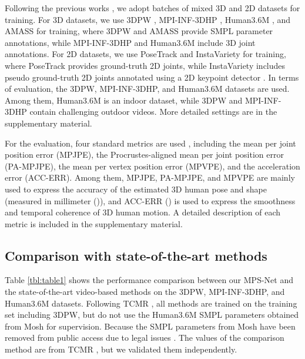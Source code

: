 \documentclass[10pt,twocolumn,letterpaper]{article}
\begin{document}
\vspace{5pt} Following the previous works \cite{Kocabas2020VIBEVI,choi2020beyond}, we adopt batches of mixed 3D and 2D datasets for training. For 3D datasets, we use 3DPW \cite{Marcard2018RecoveringA3}, MPI-INF-3DHP \cite{Mehta2017Monocular3H}, Human3.6M \cite{h36m_pami}, and AMASS \cite{Mahmood2019AMASSAO} for training, where 3DPW and AMASS provide SMPL parameter annotations, while MPI-INF-3DHP and Human3.6M include 3D joint annotations. For 2D datasets, we use PoseTrack \cite{Andriluka_2018_CVPR} and InstaVariety \cite{Kanazawa2019Learning3H} for training, where PoseTrack provides ground-truth 2D joints, while InstaVariety includes pseudo ground-truth 2D joints annotated using a 2D keypoint detector \cite{Cao2017RealtimeM2}. In terms of evaluation, the 3DPW, MPI-INF-3DHP, and Human3.6M datasets are used. Among them, Human3.6M is an indoor dataset, while 3DPW and MPI-INF-3DHP contain challenging outdoor videos.
More detailed settings are in the supplementary material.

\vspace{3pt} For the evaluation, four standard metrics are used \cite{Kocabas2020VIBEVI,choi2020beyond,Luo_2020_ACCV}, including the mean per joint position error (MPJPE), the Procrustes-aligned mean per joint position error (PA-MPJPE), the mean per vertex position error (MPVPE), and the acceleration error (ACC-ERR). Among them, MPJPE, PA-MPJPE, and MPVPE are mainly used to express the accuracy of the estimated 3D human pose and shape (measured in millimeter ()), and ACC-ERR () is used to express the smoothness and temporal coherence of 3D human motion. A detailed description of each metric is included in the supplementary material.\vspace{-5pt}

\subsection{Comparison with state-of-the-art methods}

 Table \ref{tbl:table1} shows the performance comparison between our MPS-Net and the state-of-the-art video-based methods on the 3DPW, MPI-INF-3DHP, and Human3.6M datasets. Following TCMR \cite{choi2020beyond}, all methods are trained on the training set including 3DPW, but do not use the Human3.6M SMPL parameters obtained from Mosh \cite{10.1145/2661229.2661273} for supervision. Because the SMPL parameters from Mosh have been removed from public access due to legal issues \cite{Luo_2020_ACCV}. The values of the comparison method are from TCMR \cite{choi2020beyond}, but we validated them independently.
\end{document}

